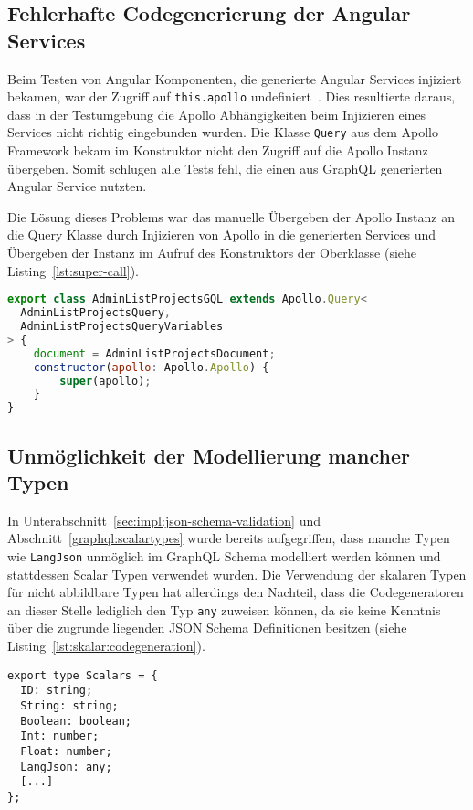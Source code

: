 \subsection{Fehlerhafte Codegenerierung der Angular Services}
Beim Testen von Angular Komponenten, die generierte Angular Services injiziert bekamen, war der Zugriff auf \texttt{this.apollo} undefiniert~\cite{github-apollo-undefined}. Dies resultierte daraus, dass in der Testumgebung die Apollo Abhängigkeiten beim Injizieren eines Services nicht richtig eingebunden wurden. Die Klasse \texttt{Query} aus dem Apollo Framework bekam im Konstruktor nicht den Zugriff auf die Apollo Instanz übergeben. Somit schlugen alle Tests fehl, die einen aus GraphQL generierten Angular Service nutzten.

Die Lösung dieses Problems war das manuelle Übergeben der Apollo Instanz an die Query Klasse durch Injizieren von Apollo in die generierten Services und Übergeben der Instanz im Aufruf des Konstruktors der Oberklasse (siehe Listing~\ref{lst:super-call}).

\begin{lstlisting}[language=JavaScript,float=h!,caption={Injizieren von Apollo in generierten Angular Service und Übergeben der Apollo Instanz an den Konstruktors der Oberklasse}, label={lst:super-call}]
export class AdminListProjectsGQL extends Apollo.Query<
  AdminListProjectsQuery,
  AdminListProjectsQueryVariables
> {
	document = AdminListProjectsDocument;
	constructor(apollo: Apollo.Apollo) {
		super(apollo);
	}
}
\end{lstlisting}

\subsection{Unmöglichkeit der Modellierung mancher Typen}
\label{sec:impl:scalar-any-types}
In Unterabschnitt~\ref{sec:impl:json-schema-validation} und Abschnitt~\ref{graphql:scalartypes} wurde bereits aufgegriffen, dass manche Typen wie \texttt{LangJson} unmöglich im GraphQL Schema modelliert werden können und stattdessen Scalar Typen verwendet wurden.
Die Verwendung der skalaren Typen für nicht abbildbare Typen hat allerdings den Nachteil, dass die Codegeneratoren an dieser Stelle lediglich den Typ \texttt{any} zuweisen können, da sie keine Kenntnis über die zugrunde liegenden JSON Schema Definitionen besitzen (siehe Listing~\ref{lst:skalar:codegeneration}).


\begin{lstlisting}[float=h!,caption={Auflistung aller skalaren Typen nach der Codegerierung zu Typescript Typen}, label={lst:skalar:codegeneration}]
export type Scalars = {
  ID: string;
  String: string;
  Boolean: boolean;
  Int: number;
  Float: number;
  LangJson: any;
  [...]
};
\end{lstlisting}

